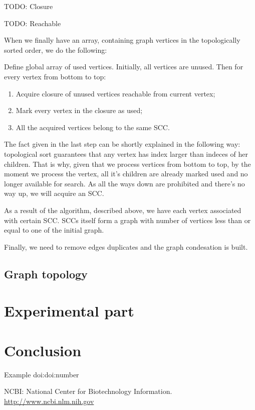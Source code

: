 \documentclass{svproc}
\providecommand{\doi}[1]{doi:\discretionary{}{}{}#1}
\begin{document}
\begin{definition}
TODO: Closure
\end{definition}

\begin{definition}
TODO: Reachable
\end{definition}

When we finally have an array, containing graph vertices in the topologically sorted order, we do the following:

Define global array of used vertices. Initially, all vertices are unused.
Then for every vertex from bottom to top:
\begin{enumerate}
    \item Acquire closure of unused vertices reachable from current vertex; 
    \item Mark every vertex in the closure as used;
    \item All the acquired vertices belong to the same SCC.
\end{enumerate}

The fact given in the last step can be shortly explained in the following way:
topological sort guarantees that any vertex has index larger than indeces of her children.
That is why, given that we process vertices from bottom to top, by the moment we process the vertex, all it's children are already marked used and no longer available for search.
As all the ways down are prohibited and there's no way up, we will acquire an SCC.\par

As a result of the algorithm, described above, we have each vertex associated with certain SCC.
SCCs itself form a graph with number of vertices less than or equal to one of the initial graph.

Finally, we need to remove edges duplicates and the graph condesation is built.

%

%
\subsection{Graph topology}
%

%
\section{Experimental part}
%

%
\section{Conclusion}
%

%
%

\begin{thebibliography}{6}
%

Example
\doi{doi:number}

NCBI: National Center for Biotechnology Information. \url{http://www.ncbi.nlm.nih.gov}

\end{thebibliography}
\end{document}
